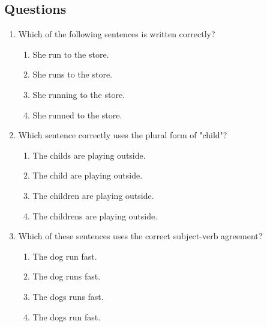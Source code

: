 \documentclass[12pt]{article}
\begin{document}
\onehalfspacing

\subsection*{Questions}

\begin{enumerate}

    \item Which of the following sentences is written correctly?

    \begin{enumerate}[label=\Alph*.]
        \item She run to the store.
        \item She runs to the store.
        \item She running to the store.
        \item She runned to the store.
    \end{enumerate}

    \vspace{0.5cm}

    \item Which sentence correctly uses the plural form of "child"?

    \begin{enumerate}[label=\Alph*.]
        \item The childs are playing outside.
        \item The child are playing outside.
        \item The children are playing outside.
        \item The childrens are playing outside.
    \end{enumerate}

    \vspace{0.5cm}

    \item Which of these sentences uses the correct subject-verb agreement?

    \begin{enumerate}[label=\Alph*.]
        \item The dog run fast.
        \item The dog runs fast.
        \item The dogs runs fast.
        \item The dogs run fast.
    \end{enumerate}

    \vspace{0.5cm}


\end{enumerate}
\end{document}
